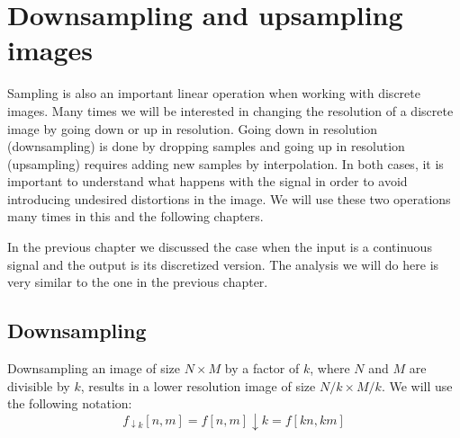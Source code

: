 \chapter{Downsampling and upsampling images}

Sampling is also an important linear operation when working with discrete images. Many times we will be interested in changing the resolution of a discrete image by going down or up in resolution. Going down in resolution (downsampling) is done by dropping samples and going up in resolution (upsampling) requires adding new samples by interpolation. In both cases, it is important to understand what happens with the signal in order to avoid introducing undesired distortions in the image. We will use these two operations many times in this and the following chapters.

In the previous chapter we discussed the case when the input is a continuous signal and the output is its discretized version. The analysis we will do here is very similar to the one in the previous chapter.

\section{Downsampling}

Downsampling an image of size $N \times M$ by a factor of $k$, where $N$ and $M$ are divisible by $k$, results in a lower resolution image of size $N/k \times M/k$. We will use the following notation:
\begin{equation}
  f_{\downarrow k} \left[n,m\right]   = f\left[n,m\right] \downarrow k = f\left[kn,km\right]
\end{equation}



